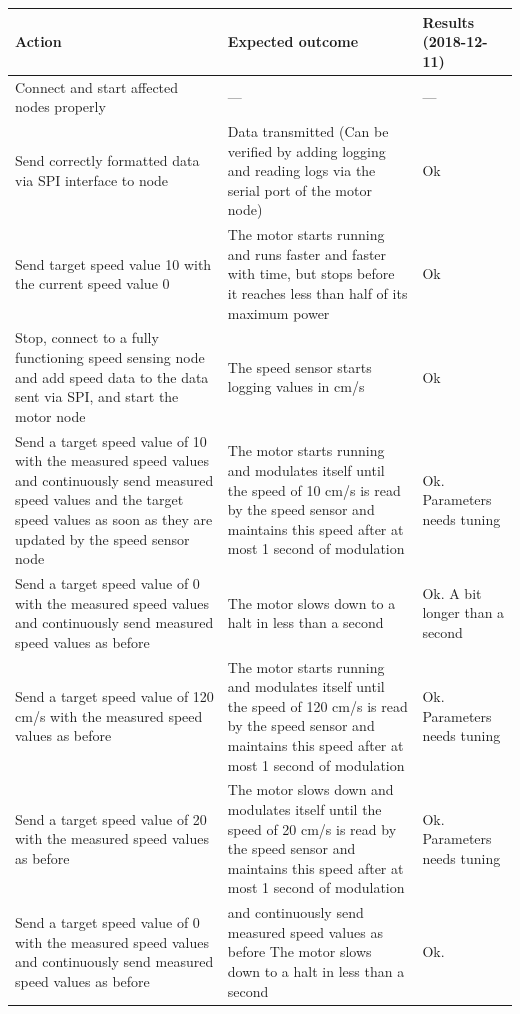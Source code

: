 \documentclass[11pt, titlepage]{article} %
\begin{document}
\begin{table}[H]
 \label{tab:title}
\centering
\begin{tabular}{|m{5cm}|m{5cm}|m{5cm}|}
\hline
Action & Expected outcome & Results (2018-12-11) \\ \hline
Connect and start affected nodes properly  & ---      & ---  \\ \hline
Send correctly formatted data via SPI interface to node  &  Data transmitted (Can be verified by adding logging and reading logs via the serial port of the motor node)     & Ok  \\ \hline
Send target speed value 10 with the current speed value 0  & The motor starts running and runs faster and faster with time, but stops before it reaches less than half of its maximum power      & Ok  \\ \hline
Stop, connect to a fully functioning speed sensing node and add speed data to the data sent via SPI, and start the motor node  & The speed sensor starts logging values in cm/s      & Ok  \\ \hline
Send a target speed value of 10 with the measured speed values and continuously send measured speed values and the target speed values as soon as they are updated by the speed sensor node  &  The motor starts running and modulates itself until the speed of 10 cm/s is read by the speed sensor and maintains this speed after at most 1 second of modulation     & Ok. Parameters needs tuning  \\ \hline
Send a target speed value of 0 with the measured speed values and continuously send measured speed values as before  & The motor slows down to a halt in less than a second      & Ok. A bit longer than a second  \\ \hline
Send a target speed value of 120 cm/s with the measured speed values as before  & The motor starts running and modulates itself until the speed of 120 cm/s is read by the speed sensor and maintains this speed after at most 1 second of modulation      & Ok. Parameters needs tuning  \\ \hline
Send a target speed value of 20 with the measured speed values as before  & The motor slows down and modulates itself until the speed of 20 cm/s is read by the speed sensor and maintains this speed after at most 1 second of modulation      & Ok. Parameters needs tuning  \\ \hline
Send a target speed value of 0 with the measured speed values and continuously send measured speed values as before  & and continuously send measured speed values as before	The motor slows down to a halt in less than a second      & Ok.  \\ \hline

\end{tabular}
\end{table}
\end{document}
